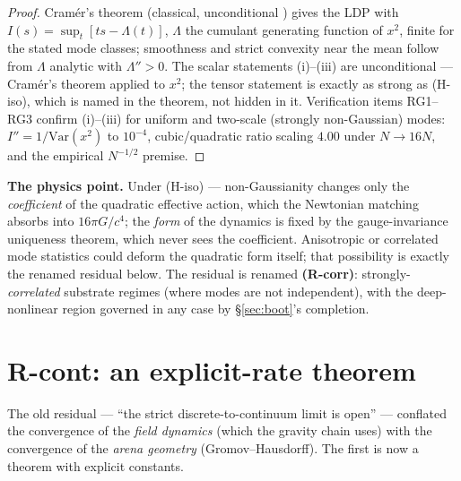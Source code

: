 \documentclass[12pt]{article}
\theoremstyle{definition}
\theoremstyle{remark}
\begin{document}
\begin{proof}
Cram\'er's theorem (classical, unconditional \citep{DemboZeitouni}) gives the LDP with $I(s) = \sup_t[ts - \Lambda(t)]$, $\Lambda$ the cumulant generating function of $x^2$, finite for the stated mode classes; smoothness and strict convexity near the mean follow from $\Lambda$ analytic with $\Lambda'' > 0$. The scalar statements (i)--(iii) are unconditional --- Cram\'er's theorem applied to $x^2$; the tensor statement is exactly as strong as (H-iso), which is named in the theorem, not hidden in it. Verification items RG1--RG3 confirm (i)--(iii) for uniform and two-scale (strongly non-Gaussian) modes: $I'' = 1/\mathrm{Var}(x^2)$ to $10^{-4}$, cubic/quadratic ratio scaling $4.00$ under $N \to 16N$, and the empirical $N^{-1/2}$ premise.
\end{proof}

\textbf{The physics point.} Under (H-iso) --- non-Gaussianity changes only the \emph{coefficient} of the quadratic effective action, which the Newtonian matching absorbs into $16\pi G/c^4$; the \emph{form} of the dynamics is fixed by the gauge-invariance uniqueness theorem, which never sees the coefficient. Anisotropic or correlated mode statistics could deform the quadratic form itself; that possibility is exactly the renamed residual below. The residual is renamed \textbf{(R-corr)}: strongly-\emph{correlated} substrate regimes (where modes are not independent), with the deep-nonlinear region governed in any case by \S\ref{sec:boot}'s completion.

\section{R-cont: an explicit-rate theorem}\label{sec:cont}

The old residual --- ``the strict discrete-to-continuum limit is open'' --- conflated the convergence of the \emph{field dynamics} (which the gravity chain uses) with the convergence of the \emph{arena geometry} (Gromov--Hausdorff). The first is now a theorem with explicit constants.
\end{document}
